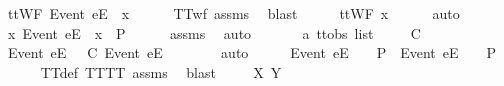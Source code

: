 \ {\isachardoublequoteopen}ttWF\ {\isacharparenleft}{\isacharbrackleft}Event\ e{\isacharbrackright}\isactrlsub E\ {\isacharhash}\ x{\isacharparenright}{\isachardoublequoteclose}\isanewline
\ \ \ \ \isamarkupfalse%
\ TT{\isacharunderscore}wf\ assms{\isacharparenleft}{}{\isacharparenright}\ \isamarkupfalse%
\ blast\isanewline
\ \ \isamarkupfalse%
\ \isamarkupfalse%
\ {\isachardoublequoteopen}ttWF\ x{\isachardoublequoteclose}\isanewline
\ \ \ \ \isamarkupfalse%
\ auto\isanewline
{}\isamarkupfalse%
\isanewline
\ \ \isamarkupfalse%
\ {\isachardoublequoteopen}{\isasymexists}x{\isachardot}\ {\isacharbrackleft}Event\ e{\isacharbrackright}\isactrlsub E\ {\isacharhash}\ x\ {\isasymin}\ P{\isachardoublequoteclose}\isanewline
\ \ \ \ \isamarkupfalse%
\ assms{\isacharparenleft}{}{\isacharparenright}\ \isamarkupfalse%
\ auto\isanewline
{}\isamarkupfalse%
\isanewline
\ \ \isamarkupfalse%
\ {\isasymrho}\ {\isasymsigma}\ {\isacharcolon}{\isacharcolon}\ {\isachardoublequoteopen}{\isacharprime}a\ ttobs\ list{\isachardoublequoteclose}\isanewline
\ \ \isamarkupfalse%
\ {\isachardoublequoteopen}{\isasymrho}\ {\isasymlesssim}\isactrlsub C\ {\isasymsigma}{\isachardoublequoteclose}\isanewline
\ \ \isamarkupfalse%
\ \isamarkupfalse%
\ {\isachardoublequoteopen}{\isacharbrackleft}Event\ e{\isacharbrackright}\isactrlsub E\ {\isacharhash}\ {\isasymrho}\ {\isasymlesssim}\isactrlsub C\ {\isacharbrackleft}Event\ e{\isacharbrackright}\isactrlsub E\ {\isacharhash}\ {\isasymsigma}{\isachardoublequoteclose}\isanewline
\ \ \ \ \isamarkupfalse%
\ auto\isanewline
\ \ \isamarkupfalse%
\ \isamarkupfalse%
\ {\isachardoublequoteopen}{\isacharbrackleft}Event\ e{\isacharbrackright}\isactrlsub E\ {\isacharhash}\ {\isasymsigma}\ {\isasymin}\ P\ {\isasymLongrightarrow}\ {\isacharbrackleft}Event\ e{\isacharbrackright}\isactrlsub E\ {\isacharhash}\ {\isasymrho}\ {\isasymin}\ P{\isachardoublequoteclose}\isanewline
\ \ \ \ \isamarkupfalse%
\ TT{}{\isacharunderscore}def\ TT{\isacharunderscore}TT{}\ assms{\isacharparenleft}{}{\isacharparenright}\ \isamarkupfalse%
\ blast\isanewline
{}\isamarkupfalse%
\isanewline
\ \ \isamarkupfalse%
\ {\isasymrho}\ X\ Y\isanewline
\ \ \isamarkupfalse%
